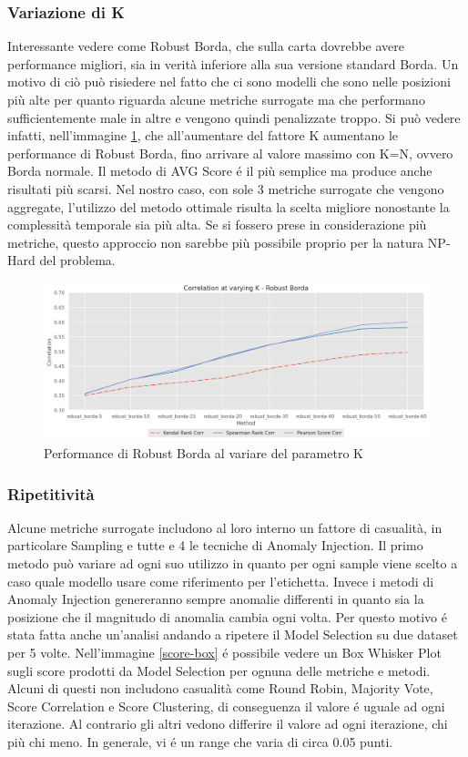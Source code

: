 \newpage
\subsubsection{Variazione di K}
Interessante vedere come Robust Borda, che sulla carta dovrebbe avere performance migliori, sia in verità inferiore alla sua versione standard Borda. Un motivo di ciò può risiedere nel fatto che ci sono modelli che sono nelle posizioni più alte per quanto riguarda alcune metriche surrogate ma che performano sufficientemente male in altre e vengono quindi penalizzate troppo.
Si può vedere infatti, nell'immagine \ref{varying-k}, che all'aumentare del fattore K aumentano le performance di Robust Borda, fino arrivare al valore massimo con K=N, ovvero Borda normale.
Il metodo di AVG Score é il più semplice ma produce anche risultati più scarsi. Nel nostro caso, con sole 3 metriche surrogate che vengono aggregate, l'utilizzo del metodo ottimale risulta la scelta migliore nonostante la complessità temporale sia più alta. Se si fossero prese in considerazione più metriche, questo approccio non sarebbe più possibile proprio per la natura NP-Hard del problema.

\begin{figure}[t]
	\centering
	\includegraphics[width=14cm, scale=1]{images/varying-k}
	\caption{Performance di Robust Borda al variare del parametro K}
	\label{varying-k}
		
\end{figure}

\subsubsection{Ripetitività}
Alcune metriche surrogate includono al loro interno un fattore di casualità, in particolare Sampling e tutte e 4 le tecniche di Anomaly Injection. Il primo metodo può variare ad ogni suo utilizzo in quanto per ogni sample viene scelto a caso quale modello usare come riferimento per l'etichetta. Invece i metodi di Anomaly Injection genereranno sempre anomalie differenti in quanto sia la posizione che il magnitudo di anomalia cambia ogni volta.
Per questo motivo é stata fatta anche un'analisi andando a ripetere il Model Selection su due dataset per 5 volte.
Nell'immagine \ref{score-box}  é possibile vedere un Box Whisker Plot sugli score prodotti da Model Selection per ognuna delle metriche e metodi. Alcuni di questi non includono casualità come Round Robin, Majority Vote, Score Correlation e Score Clustering, di conseguenza il valore é uguale ad ogni iterazione. Al contrario gli altri vedono differire il valore ad ogni iterazione, chi più chi meno. In generale, vi é un range che varia di circa 0.05 punti.

